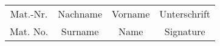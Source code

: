 \documentclass{article}
\begin{document}
\begin{tabular}{cccc}
  Mat.-Nr. & Nachname & Vorname & Unterschrift \\
  Mat. No. & Surname  & Name    & Signature
\end{tabular}
\end{document}
